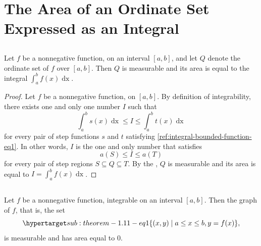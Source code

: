 \documentclass{report}
\begin{document}
\section{The Area of an Ordinate Set Expressed as an Integral}%

\subsection{}%

  \begin{theorem}[1.10]
    Let $f$ be a nonnegative function,  on an interval
      $[a, b]$, and let $Q$ denote the ordinate set of $f$ over $[a, b]$.
    Then $Q$ is measurable and its area is equal to the integral
      $\int_a^b f(x) \mathop{dx}$.
  \end{theorem}

  \begin{proof}
    Let $f$ be a nonnegative function,  on $[a, b]$.
    By definition of integrability, there exists one and only one number $I$
      such that
      $$\int_a^b s(x) \mathop{dx} \leq I \leq \int_a^b t(x) \mathop{dx}$$ for
      every pair of step functions $s$ and $t$ satisfying
      \eqref{ref:integral-bounded-function-eq1}.
    In other words, $I$ is the one and only number that satisfies
      $$a(S) \leq I \leq a(T)$$ for every pair of step regions
      $S \subseteq Q \subseteq T$.
    By the , $Q$ is measurable and its
      area is equal to $I = \int_a^b f(x) \mathop{dx}$.
  \end{proof}

\subsection{}%

  \begin{theorem}[1.11]
    Let $f$ be a nonnegative function, integrable on an interval $[a, b]$.
    Then the graph of $f$, that is, the set
      \begin{equation}
        \hyperlabel{sub:theorem-1.11-eq1}
        \{(x, y) \mid a \leq x \leq b, y = f(x)\},
      \end{equation}
      is measurable and has area equal to $0$.
  \end{theorem}
\end{document}
